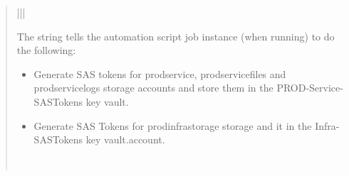 \documentclass[letterpaper,10pt,english]{sphinxmanual}
\begin{document}
\begin{quote}
\begin{savenotes}
\begin{tabular}[t]{|*{2}{|}}
\begin{description}
\end{description}

The string tells the automation script job instance
(when running) to do the following:
\begin{itemize}
\item {} 
Generate SAS tokens for prodservice, prodservicefiles
and prodservicelogs storage accounts and store them in
the PROD-Service-SASTokens key vault.

\item {} 
Generate SAS Tokens for prodinfrastorage storage and
it in the Infra-SASTokens key vault.account.

\end{itemize}
\\
\hline
\end{tabular}
\par
\sphinxattableend\end{savenotes}
\end{quote}
\end{document}
